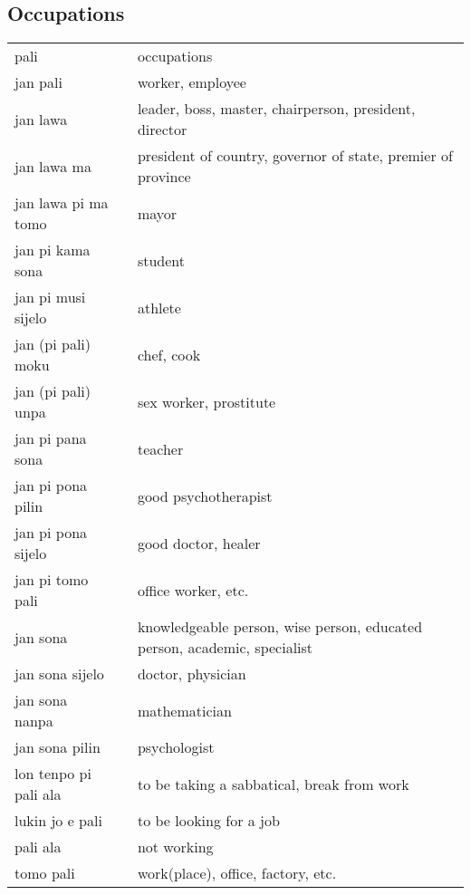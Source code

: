 \subsection{Occupations}
%
\begin{supertabular}{p{4,5cm}|ll}
pali && occupations \\
jan pali && worker, employee \\
jan lawa && leader, boss, master, chairperson, president, director \\
jan lawa ma && president of country, governor of state, premier of province \\
jan lawa pi ma tomo && mayor \\
jan pi kama sona && student \\
jan pi musi sijelo && athlete \\
jan (pi pali) moku && chef, cook \\
jan (pi pali) unpa && sex worker, prostitute \\ 
jan pi pana sona && teacher \\
jan pi pona pilin && good psychotherapist \\
jan pi pona sijelo && good doctor, healer \\
jan pi tomo pali && office worker, etc. \\
jan sona && knowledgeable person, wise person, educated person, academic, specialist \\
jan sona sijelo && doctor, physician \\
jan sona nanpa && mathematician \\
jan sona pilin && psychologist \\
lon tenpo pi pali ala && to be taking a sabbatical, break from work \\
lukin jo e pali && to be looking for a job \\
pali ala && not working \\
tomo pali && work(place), office, factory, etc. \\
\end{supertabular} \\
%
%
